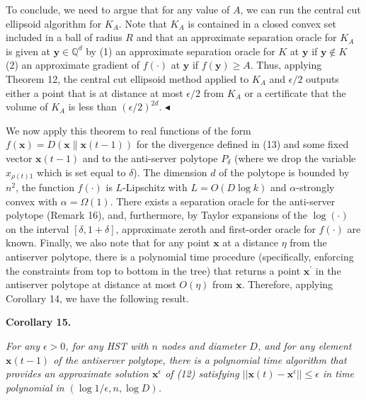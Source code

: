 \documentclass[10pt,a4paper]{article}
\begin{document}
To conclude, we need to argue that for any value of $A$, we can run the central cut ellipsoid algorithm for $K_{A}$. Note that $K_{A}$ is contained in a closed convex set included in a ball of radius $R$ and that an approximate separation oracle for $K_{A}$ is given at ${\boldsymbol{y}}\in\mathbb{Q}^{d}$ by (1) an approximate separation oracle for $K$ at ${\boldsymbol{y}}$ if ${\boldsymbol{y}}\not\in K$ (2) an approximate gradient of $f(\cdot)$ at ${\boldsymbol{y}}$ if $f({\boldsymbol{y}})\geq A$. Thus, applying Theorem 12, the central cut ellipsoid method applied to $K_{A}$ and $\epsilon/2$ outputs either a point that is at distance at most $\epsilon/2$ from $K_{A}$ or a certificate that the volume of $K_{A}$ is less than $(\epsilon/2)^{2d}$.
$\blacktriangleleft$\par




We now apply this theorem to real functions of the form $f({\boldsymbol{x}})=D({\boldsymbol{x}}\parallel{\boldsymbol{x}}(t-1))$ for the divergence defined in (13) and some fixed vector ${\boldsymbol{x}}(t-1)$ and to the anti-server polytope $P_{\delta}$ (where we drop the variable $x_{\rho(t)1}$ which is set equal to $\delta$). The dimension $d$ of the polytope is bounded by $n^{2}$, the function $f(\cdot)$ is $L$-Lipschitz with $L=O(D\log k)$ and $\alpha$-strongly convex with $\alpha=\Omega(1)$. There exists a separation oracle for the anti-server polytope (Remark 16), and, furthermore, by Taylor expansions of the $\log(\cdot)$ on the interval $[\delta,1+\delta]$, approximate zeroth and first-order oracle for $f(\cdot)$ are known. Finally, we also note that for any point ${\boldsymbol{x}}$ at a distance $\eta$ from the antiserver polytope, there is a polynomial time procedure (specifically, enforcing the constraints from top to bottom in the tree) that returns a point ${\boldsymbol{x}}^{\prime}$ in the antiserver polytope at distance at most $O(\eta)$ from ${\boldsymbol{x}}$. Therefore, applying Corollary 14, we have the following result.\par





\par\medskip\noindent\textbf{
\textbf{Corollary 15}\textbf{.}
}\par



\emph{For any $\epsilon>0$, for any HST with $n$ nodes and diameter $D$, and for any element ${\boldsymbol{x}}(t-1)$ of the antiserver polytope, there is a polynomial time algorithm that provides an approximate solution ${\boldsymbol{x}}^{\epsilon}$ of (12) satisfying $||{\boldsymbol{x}}(t)-{\boldsymbol{x}}^{\epsilon}||\leq\epsilon$ in time polynomial in $(\log 1/\epsilon,n,\log D)$.}\par
\end{document}
